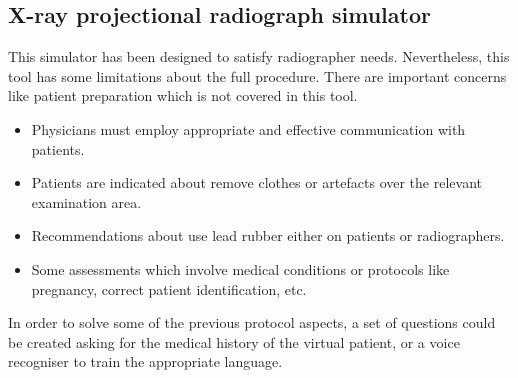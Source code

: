 \subsection{X-ray projectional radiograph simulator}


This simulator has been designed to satisfy radiographer needs. Nevertheless, this tool has some limitations about the full procedure. There are important concerns like patient preparation which is not covered in this tool.
\begin{itemize}
 \item Physicians must employ appropriate and effective communication with patients.

 \item Patients are indicated about remove clothes or artefacts over the relevant examination area.

 \item Recommendations about use lead rubber either on patients or radiographers.

 \item Some assessments which involve medical conditions or protocols like pregnancy, correct patient identification, etc.
 
 \end{itemize}

In order to solve some of the previous protocol aspects, a set of questions could be created asking for the medical history of the virtual patient, or a voice recogniser to train the appropriate language.


